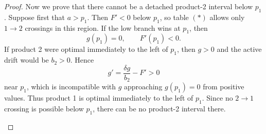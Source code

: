 \documentclass[11pt]{article}
\begin{document}
\begin{proof}

Now we prove that there cannot be a detached product-2 interval below $p_1$.
Suppose first that $a>p_1$. Then $F'<0$ below $p_1$, so table $(*)$
allows only $1\to2$ crossings in this region. If the low branch wins at
$p_1$, then
\begin{equation*}
    g(p_1)=0,
    \qquad
    F'(p_1)<0.
\end{equation*}
If product 2 were optimal immediately to the left of $p_1$, then
$g>0$ and the active drift would be $b_2>0$. Hence
\begin{equation*}
    g'=\frac{\delta g}{b_2}-F'>0
\end{equation*}
near $p_1$, which is incompatible with $g$ approaching
$g(p_1)=0$ from positive values. Thus product 1 is optimal immediately
to the left of $p_1$. Since no $2\to1$ crossing is possible below $p_1$,
there can be no product-2 interval there.

\begin{figure}[H]
\centering
{}
\end{figure}


\end{proof}
\end{document}

